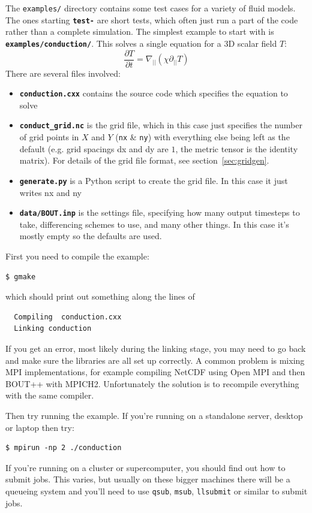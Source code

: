 \documentclass[12pt]{article}
\newcommand{\code}[1]{\texttt{#1}}
\newcommand{\file}[1]{\texttt{\bf #1}}
\newcommand{\deriv}[2]{\ensuremath{\frac{\partial #1}{\partial #2}}}
\begin{document}
The \texttt{examples/} directory contains some test cases for a variety of fluid models. The ones starting
\file{test-} are short tests, which often just run a part of the code rather than a complete simulation. 
The simplest example to start with is \file{examples/conduction/}. This solves a single equation for
a 3D scalar field $T$:
\[
\deriv{T}{t} = \nabla_{||}\left(\chi\partial_{||} T\right)
\]
There are several files involved:
\begin{itemize}
\item \file{conduction.cxx} contains the source code which specifies the equation to solve
\item \file{conduct\_grid.nc} is the grid file, which in this case just specifies the number
  of grid points in $X$ and $Y$ (\code{nx} \& \code{ny}) with everything else being left as the default (e.g. grid
  spacings dx and dy are $1$, the metric tensor is the identity matrix). For details of the
  grid file format, see section~\ref{sec:gridgen}.
\item \file{generate.py} is a Python script to create the grid file. In this case it just
  writes nx and ny 
\item \file{data/BOUT.inp} is the settings file, specifying how many output timesteps to take, 
  differencing schemes to use, and many other things. In this case it's mostly empty so the defaults
  are used.
\end{itemize}

First you need to compile the example:
\begin{verbatim}
$ gmake
\end{verbatim}
which should print out something along the lines of
\begin{verbatim}
  Compiling  conduction.cxx
  Linking conduction
\end{verbatim}
If you get an error, most likely during the linking stage, you may need to go back and make sure the
libraries are all set up correctly. A common problem is mixing MPI implementations, for example compiling NetCDF using Open MPI and then BOUT++ with MPICH2. Unfortunately the solution is to recompile everything with the same compiler.

Then try running the example. If you're running on a standalone server, desktop or laptop then try:
\begin{verbatim}
$ mpirun -np 2 ./conduction
\end{verbatim}
If you're running on a cluster or supercomputer, you should find out how to submit jobs. This varies, but
usually on these bigger machines there will be a queueing system and you'll need to use \code{qsub},
\code{msub}, \code{llsubmit} or similar to submit jobs. 
\end{document}

